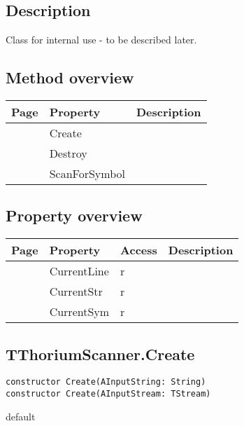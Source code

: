 \subsection{Description}
Class for internal use - to be described later.%
\subsection{Method overview}
\label{thoriumcorepkg:thorium:tthoriumscanner:methods}
\begin{tabularx}{\textwidth}{llX}
Page & Property & Description  \\ \hline
\pageref{thoriumcorepkg:thorium:tthoriumscanner:create} & Create  &  \\
\pageref{thoriumcorepkg:thorium:tthoriumscanner:destroy} & Destroy  &  \\
\pageref{thoriumcorepkg:thorium:tthoriumscanner:scanforsymbol} & ScanForSymbol  &  \\
\hline
\end{tabularx}
\subsection{Property overview}
\label{thoriumcorepkg:thorium:tthoriumscanner:properties}
\begin{tabularx}{\textwidth}{lllX}
Page & Property & Access & Description \\ \hline
\pageref{thoriumcorepkg:thorium:tthoriumscanner:currentline} & CurrentLine & r &  \\
\pageref{thoriumcorepkg:thorium:tthoriumscanner:currentstr} & CurrentStr & r &  \\
\pageref{thoriumcorepkg:thorium:tthoriumscanner:currentsym} & CurrentSym & r &  \\
\hline
\end{tabularx}
\subsection{TThoriumScanner.Create}
\label{thoriumcorepkg:thorium:tthoriumscanner:create}
\begin{FPCList}
\Declaration 

\begin{verbatim}
constructor Create(AInputString: String)
constructor Create(AInputStream: TStream)
\end{verbatim}
\Visibility
default
\end{FPCList}
